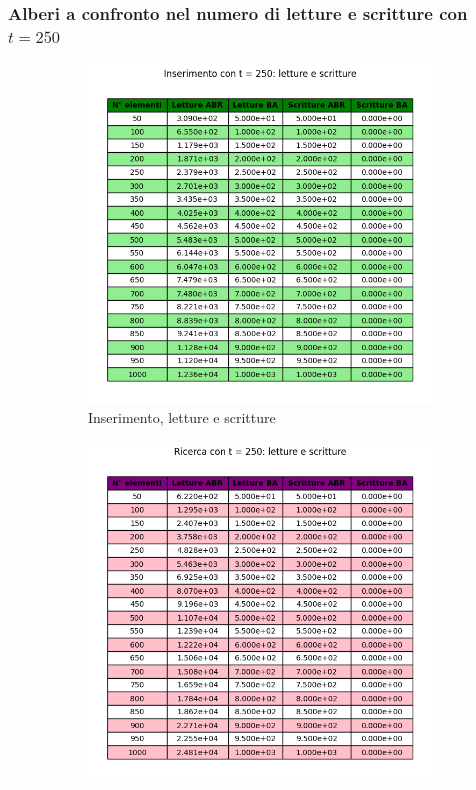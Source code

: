\subsubsection{Alberi a confronto nel numero di letture e scritture con $t = 250$}

\begin{figure}[H]
    \centering
    \begin{subfigure}[b]{0.49\textwidth}
        \centering
        \includegraphics[width=\textwidth]{tables/insert-wr-t250.png}
        \caption{Inserimento, letture e scritture}
        \label{fig:tableinsertwr250}
    \end{subfigure}
    \hfill
    \begin{subfigure}[b]{0.49\textwidth}
        \centering
        \includegraphics[width=\textwidth]{tables/search-wr-t250.png}

\end{subfigure}
\end{figure}
